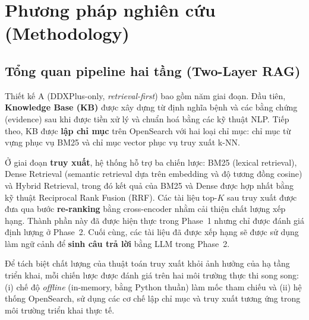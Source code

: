 
\section{Phương pháp nghiên cứu (Methodology)}
\label{sec:phuongphap}

\subsection{Tổng quan pipeline hai tầng (Two-Layer RAG)}

Thiết kế A (DDXPlus-only, \textit{retrieval-first}) bao gồm năm giai đoạn. Đầu tiên, \textbf{Knowledge Base (KB)} được xây dựng từ định nghĩa bệnh và các bằng chứng (evidence) sau khi được tiền xử lý và chuẩn hoá bằng các kỹ thuật NLP. Tiếp theo, KB được \textbf{lập chỉ mục} trên OpenSearch với hai loại chỉ mục: chỉ mục từ vựng phục vụ BM25 và chỉ mục vector phục vụ truy xuất k-NN.

Ở giai đoạn \textbf{truy xuất}, hệ thống hỗ trợ ba chiến lược: BM25 (lexical retrieval), Dense Retrieval (semantic retrieval dựa trên embedding và độ tương đồng cosine) và Hybrid Retrieval, trong đó kết quả của BM25 và Dense được hợp nhất bằng kỹ thuật Reciprocal Rank Fusion (RRF). Các tài liệu top-$K$ sau truy xuất được đưa qua bước \textbf{re-ranking} bằng cross-encoder nhằm cải thiện chất lượng xếp hạng. Thành phần này đã được hiện thực trong Phase~1 nhưng chỉ được đánh giá định lượng ở Phase~2. Cuối cùng, các tài liệu đã được xếp hạng sẽ được sử dụng làm ngữ cảnh để \textbf{sinh câu trả lời} bằng LLM trong Phase~2.

Để tách biệt chất lượng của thuật toán truy xuất khỏi ảnh hưởng của hạ tầng triển khai, mỗi chiến lược được đánh giá trên hai môi trường thực thi song song: (i) chế độ \textit{offline} (in-memory, bằng Python thuần) làm mốc tham chiếu và (ii) hệ thống OpenSearch, sử dụng các cơ chế lập chỉ mục và truy xuất tương ứng trong môi trường triển khai thực tế.

